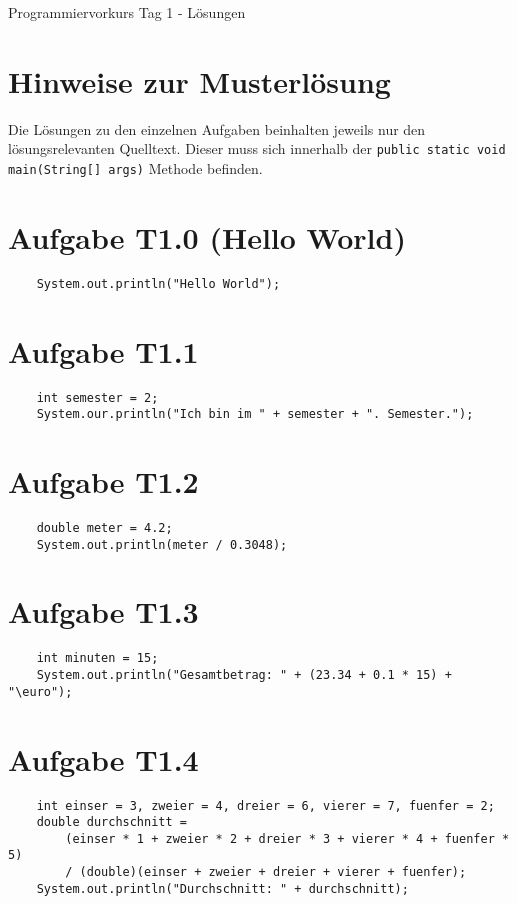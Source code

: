 \documentclass[final,a4paper]{article}
\begin{document}


{\huge Programmiervorkurs Tag 1 - Lösungen}

\bigskip

\section*{Hinweise zur Musterlösung}
Die Lösungen zu den einzelnen Aufgaben beinhalten jeweils nur den lösungsrelevanten Quelltext. Dieser muss sich innerhalb der \texttt{public static void main(String[] args)} Methode befinden.
\section*{Aufgabe T1.0 (Hello World)}
\begin{lstlisting}
	System.out.println("Hello World");
\end{lstlisting}
\section*{Aufgabe T1.1}
\begin{lstlisting}
	int semester = 2;
	System.our.println("Ich bin im " + semester + ". Semester.");
\end{lstlisting}
\section*{Aufgabe T1.2}
\begin{lstlisting}
	double meter = 4.2;
	System.out.println(meter / 0.3048);
\end{lstlisting}
\section*{Aufgabe T1.3}
\begin{lstlisting}
	int minuten = 15;
	System.out.println("Gesamtbetrag: " + (23.34 + 0.1 * 15) + "\euro");
\end{lstlisting}
\section*{Aufgabe T1.4}
\begin{lstlisting}
	int einser = 3, zweier = 4, dreier = 6, vierer = 7, fuenfer = 2;
	double durchschnitt = 
		(einser * 1 + zweier * 2 + dreier * 3 + vierer * 4 + fuenfer * 5)
		/ (double)(einser + zweier + dreier + vierer + fuenfer);
	System.out.println("Durchschnitt: " + durchschnitt);
\end{lstlisting}
\end{document}
